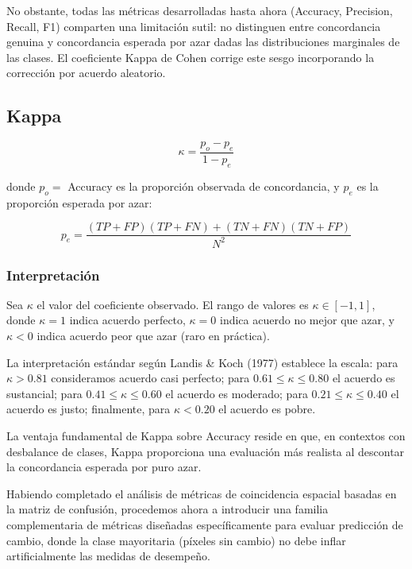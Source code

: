 No obstante, todas las métricas desarrolladas hasta ahora (Accuracy, Precision, Recall, F1) comparten una limitación sutil: no distinguen entre concordancia genuina y concordancia esperada por azar dadas las distribuciones marginales de las clases. El coeficiente Kappa de Cohen corrige este sesgo incorporando la corrección por acuerdo aleatorio.

\subsection{Kappa}

\begin{equation}
\kappa = \frac{p_o - p_e}{1 - p_e}
\label{eq:kappa}
\end{equation}

donde $p_o = $ Accuracy es la proporción observada de concordancia, y $p_e$ es la proporción esperada por azar:

\begin{equation}
p_e = \frac{(TP + FP)(TP + FN) + (TN + FN)(TN + FP)}{N^2}
\label{eq:pe}
\end{equation}

\subsubsection{Interpretación}

Sea $\kappa$ el valor del coeficiente observado. El rango de valores es $\kappa \in [-1, 1]$, donde $\kappa = 1$ indica acuerdo perfecto, $\kappa = 0$ indica acuerdo no mejor que azar, y $\kappa < 0$ indica acuerdo peor que azar (raro en práctica).

La interpretación estándar según Landis \& Koch (1977) establece la escala: para $\kappa > 0.81$ consideramos acuerdo casi perfecto; para $0.61 \leq \kappa \leq 0.80$ el acuerdo es sustancial; para $0.41 \leq \kappa \leq 0.60$ el acuerdo es moderado; para $0.21 \leq \kappa \leq 0.40$ el acuerdo es justo; finalmente, para $\kappa < 0.20$ el acuerdo es pobre.

La ventaja fundamental de Kappa sobre Accuracy reside en que, en contextos con desbalance de clases, Kappa proporciona una evaluación más realista al descontar la concordancia esperada por puro azar.

Habiendo completado el análisis de métricas de coincidencia espacial basadas en la matriz de confusión, procedemos ahora a introducir una familia complementaria de métricas diseñadas específicamente para evaluar predicción de cambio, donde la clase mayoritaria (píxeles sin cambio) no debe inflar artificialmente las medidas de desempeño.

